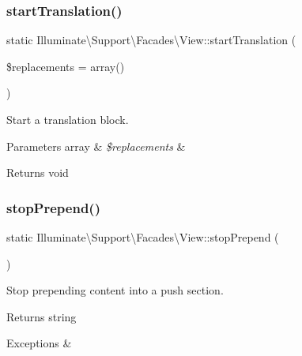 \subsubsection{\texorpdfstring{start\+Translation()}{startTranslation()}}
{\footnotesize\ttfamily static Illuminate\textbackslash{}\+Support\textbackslash{}\+Facades\textbackslash{}\+View\+::start\+Translation (\begin{DoxyParamCaption}\item[{}]{\$replacements = {\ttfamily array()} }\end{DoxyParamCaption})\hspace{0.3cm}{\ttfamily [static]}}

Start a translation block.


\begin{DoxyParams}[1]{Parameters}
array & {\em \$replacements} & \\
\hline
\end{DoxyParams}
\begin{DoxyReturn}{Returns}
void 
\end{DoxyReturn}
\mbox{\label{class_illuminate_1_1_support_1_1_facades_1_1_view_afed9e2d0bc20c62e23de4ac522dc3153}} 
\subsubsection{\texorpdfstring{stop\+Prepend()}{stopPrepend()}}
{\footnotesize\ttfamily static Illuminate\textbackslash{}\+Support\textbackslash{}\+Facades\textbackslash{}\+View\+::stop\+Prepend (\begin{DoxyParamCaption}{ }\end{DoxyParamCaption})\hspace{0.3cm}{\ttfamily [static]}}

Stop prepending content into a push section.

\begin{DoxyReturn}{Returns}
string 
\end{DoxyReturn}

\begin{DoxyExceptions}{Exceptions}
{\em } & \\
\hline
\end{DoxyExceptions}
\mbox{\label{class_illuminate_1_1_support_1_1_facades_1_1_view_a756138ec6e62d616cc8b9f8457c18d8d}} 

